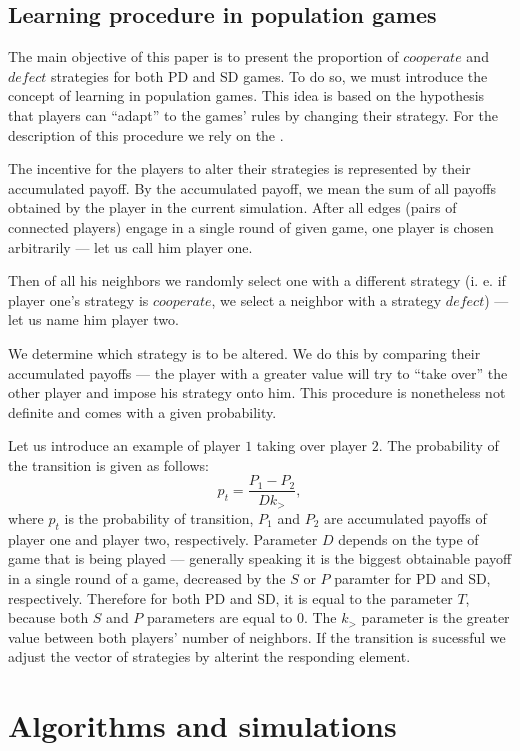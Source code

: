 \documentclass[english, twoside, 12pt, a4paper]{article}
\theoremstyle{definition}
\theoremstyle{plain}
\theoremstyle{remark}
\begin{document}
\subsection{Learning procedure in population games}

The main objective of this paper is to present the proportion of $cooperate$ and $defect$ strategies for both PD and SD games. To do so, we must introduce the concept of learning in population games. This idea is based on the hypothesis that players can \enquote{adapt} to the games' rules by changing their strategy. For the description of this procedure we rely on the \cite{santos2005scale}. 

The incentive for the players to alter their strategies is represented by their accumulated payoff. By the accumulated payoff, we mean the sum of all payoffs obtained by the player in the current simulation. 
After all edges (pairs of connected players) engage in a single round of given game, one player is chosen arbitrarily --- let us call him player one. 

Then of all his neighbors we randomly select one with a different strategy (i. e. if player one's strategy is $cooperate$, we select a neighbor with a strategy $defect$) --- let us name him player two.

We determine which strategy is to be altered. We do this by comparing their accumulated payoffs --- the player with a greater value will try to \enquote{take over} the other player and impose his strategy onto him. This procedure is nonetheless not definite and comes with a given probability. 

Let us introduce an example of player $1$ taking over player $2$. The probability of the transition is given as follows:
\[
  p_t = \frac{P_1-P_2}{Dk_>},
\]
where $p_t$ is the probability of transition, $P_1$ and $P_2$ are accumulated payoffs of player one and player two, respectively. Parameter $D$ depends on the type of game that is being played --- generally speaking it is the biggest obtainable payoff in a single round of a game, decreased by the $S$ or $P$ paramter for PD and SD, respectively. Therefore for both PD and SD, it is equal to the parameter $T$, because both $S$ and $P$ parameters are equal to $0$. The $k_>$ parameter is the greater value between both players' number of neighbors.
If the transition is sucessful we adjust the vector of strategies by alterint the responding element. 
\clearpage
\section{Algorithms and simulations}
\end{document}
